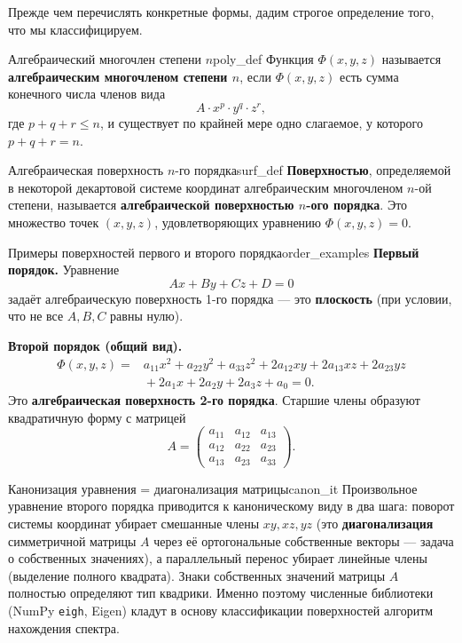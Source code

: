 \documentclass[12pt,a4paper]{article}
\begin{document}
Прежде чем перечислять конкретные формы, дадим строгое определение
того, что мы классифицируем.

\begin{definition}{Алгебраический многочлен степени $n$}{poly_def}
  Функция $\Phi(x, y, z)$ называется \textbf{алгебраическим
  многочленом степени $n$}, если $\Phi(x, y, z)$ есть сумма конечного
  числа членов вида
  \[
    A \cdot x^p \cdot y^q \cdot z^r,
  \]
  где $p + q + r \le n$, и существует по крайней мере одно слагаемое,
  у которого $p + q + r = n$.
\end{definition}

\begin{definition}{Алгебраическая поверхность $n$-го порядка}{surf_def}
  \textbf{Поверхностью}, определяемой в некоторой декартовой системе
  координат алгебраическим многочленом $n$-ой степени, называется
  \textbf{алгебраической поверхностью $n$-ого порядка}. Это множество
  точек $(x, y, z)$, удовлетворяющих уравнению $\Phi(x, y, z) = 0$.
\end{definition}

\begin{definition}{Примеры поверхностей первого и второго
  порядка}{order_examples}
  \textbf{Первый порядок.} Уравнение
  \begin{equation}
    Ax + By + Cz + D = 0 \tag{11.1}
  \end{equation}
  задаёт алгебраическую поверхность 1-го порядка — это
  \textbf{плоскость} (при условии, что не все $A, B, C$ равны нулю).

  \textbf{Второй порядок (общий вид).}
  \begin{equation}
  \begin{aligned}
    \Phi(x, y, z) = {}& a_{11}x^2 + a_{22}y^2 + a_{33}z^2
    + 2a_{12}xy + 2a_{13}xz + 2a_{23}yz \\
    & {}+ 2a_1 x + 2a_2 y + 2a_3 z + a_0 = 0.
  \end{aligned} \tag{11.2}
  \end{equation}
  Это \textbf{алгебраическая поверхность 2-го порядка}. Старшие члены
  образуют квадратичную форму с матрицей
  \[
    A =
    \begin{pmatrix}
      a_{11} & a_{12} & a_{13} \\
      a_{12} & a_{22} & a_{23} \\
      a_{13} & a_{23} & a_{33}
    \end{pmatrix}.
  \]
\end{definition}

\begin{remarkIT}{Канонизация уравнения = диагонализация матрицы}{canon_it}
  Произвольное уравнение второго порядка приводится к каноническому
  виду в два шага: поворот системы координат убирает смешанные члены
  $xy, xz, yz$ (это \textbf{диагонализация} симметричной матрицы $A$
    через её ортогональные собственные векторы — задача о собственных
  значениях), а параллельный перенос убирает линейные члены (выделение
  полного квадрата). Знаки собственных значений матрицы $A$ полностью
  определяют тип квадрики. Именно поэтому численные библиотеки
  (NumPy \texttt{eigh}, Eigen) кладут в основу классификации
  поверхностей алгоритм нахождения спектра.
\end{remarkIT}
\end{document}
